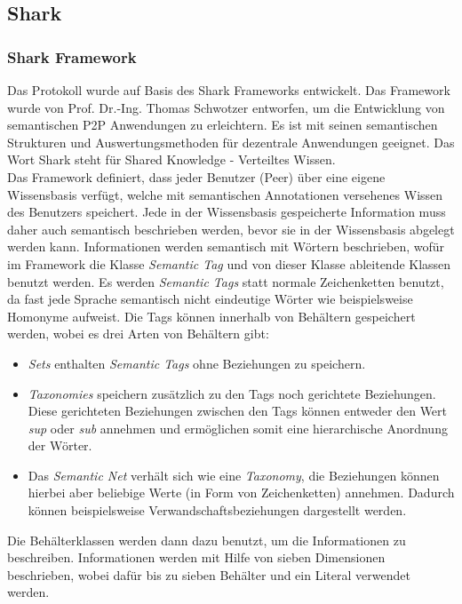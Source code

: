 \subsection{Shark}
\subsubsection{Shark Framework}
Das Protokoll wurde auf Basis des Shark Frameworks entwickelt. Das Framework wurde von Prof. Dr.-Ing. Thomas Schwotzer entworfen, um die Entwicklung von semantischen P2P Anwendungen zu erleichtern. Es ist mit seinen semantischen Strukturen und Auswertungsmethoden für dezentrale Anwendungen geeignet. Das Wort Shark steht für Shared Knowledge - Verteiltes Wissen.
\\Das Framework definiert, dass jeder Benutzer (Peer) über eine eigene Wissensbasis verfügt, welche mit semantischen Annotationen versehenes Wissen des Benutzers speichert. Jede in der Wissensbasis gespeicherte Information muss daher auch semantisch beschrieben werden, bevor sie in der Wissensbasis abgelegt werden kann. Informationen werden semantisch mit Wörtern beschrieben, wofür im Framework die Klasse \textit{Semantic Tag} und von dieser Klasse ableitende Klassen benutzt werden. Es werden \textit{Semantic Tags} statt normale Zeichenketten benutzt, da fast jede Sprache semantisch nicht eindeutige Wörter wie beispielsweise Homonyme aufweist. Die Tags können innerhalb von Behältern gespeichert werden, wobei es drei Arten von Behältern gibt:
\begin{itemize}
	\item \textit{Sets} enthalten \textit{Semantic Tags} ohne Beziehungen zu speichern.
	\item \textit{Taxonomies} speichern zusätzlich zu den Tags noch gerichtete Beziehungen. Diese gerichteten Beziehungen zwischen den Tags können entweder den Wert \textit{sup} oder \textit{sub} annehmen und ermöglichen somit eine hierarchische Anordnung der Wörter.
	\item Das \textit{Semantic Net} verhält sich wie eine \textit{Taxonomy}, die Beziehungen können hierbei aber beliebige Werte (in Form von Zeichenketten) annehmen. Dadurch können beispielsweise Verwandschaftsbeziehungen dargestellt werden.
\end{itemize}
Die Behälterklassen werden dann dazu benutzt, um die Informationen zu beschreiben. Informationen werden mit Hilfe von sieben Dimensionen beschrieben, wobei dafür bis zu sieben Behälter und ein Literal verwendet werden.

